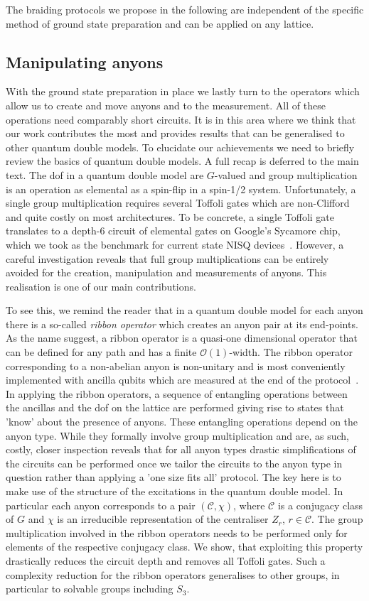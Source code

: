 \documentclass[a4paper,twocolumn,11pt, accepted=2024-06-14]{quantumarticle}
\begin{document}
The braiding protocols we propose in the following are independent of the specific method of ground state preparation and can be applied on any lattice.


\subsection{Manipulating anyons}
With the ground state preparation in place we lastly turn to the operators which allow us to create and move anyons and to the measurement. All of these operations need comparably short circuits. It is in this area where we think that our work contributes the most and provides results that can be generalised to other quantum double models. To elucidate our achievements we need to briefly review the basics of quantum double models. A full recap is deferred to the main text. The dof in a quantum double model are $G$-valued and group multiplication is an operation as elemental as a spin-flip in a spin-1/2 system. Unfortunately, a single group multiplication requires several Toffoli gates which are non-Clifford and quite costly on most architectures. To be concrete, a single Toffoli gate translates to a depth-6 circuit of elemental gates on Google's Sycamore chip, which we took as the benchmark for current state NISQ devices~\cite{weber}. However, a careful investigation reveals that full group multiplications can be entirely avoided for the creation, manipulation and measurements of anyons. This realisation is one of our main contributions.

To see this, we remind the reader that in a quantum double model for each anyon there is a so-called \emph{ribbon operator} which creates an anyon pair at its end-points. As the name suggest, a ribbon operator is a quasi-one dimensional operator that can be defined for any path and has a finite $\mathcal O(1)$-width. The ribbon operator corresponding to a non-abelian anyon is non-unitary and is most conveniently implemented with ancilla qubits which are measured at the end of the protocol~\cite{Cirac}. In applying the ribbon operators, a sequence of entangling operations between the ancillas and the dof on the lattice are performed giving rise to states that 'know' about the presence of anyons. These entangling operations depend on the anyon type. While they formally involve group multiplication and are, as such, costly, closer inspection reveals that for all anyon types drastic simplifications of the circuits can be performed once we tailor the circuits to the anyon type in question rather than applying a 'one size fits all' protocol. The key here is to make use of the structure of the excitations in the quantum double model. In particular each anyon corresponds to a pair $(\mathcal C,\chi)$, where $\mathcal C$ is a conjugacy class of $G$ and $\chi$ is an irreducible representation of the centraliser $Z_r$, $r \in \mathcal C$. The group multiplication involved in the ribbon operators needs to be performed only for elements of the respective conjugacy class. We show, that exploiting this property drastically reduces the circuit depth and removes all Toffoli gates. Such a complexity reduction for the ribbon operators generalises to other groups, in particular to solvable groups including $S_3$. 
\end{document}
